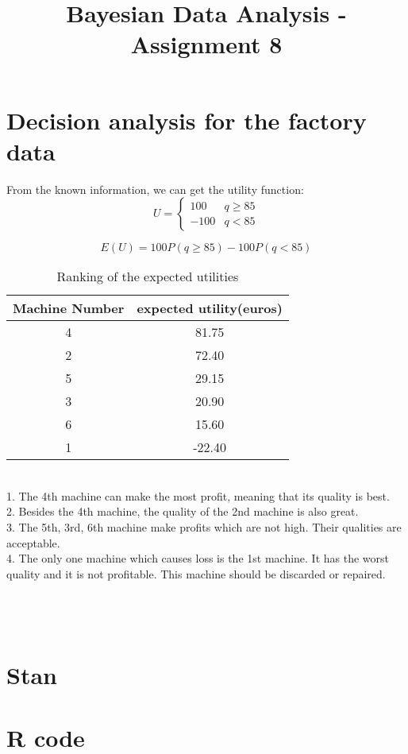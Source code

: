 \documentclass[article,11pt]{article}
\title{\huge Bayesian Data Analysis - Assignment 8}
\begin{document}
 \maketitle
 \section*{Decision analysis for the factory data}
 From the known information, we can get the utility function:
 \begin{equation*}
 U=
 \begin{cases}
 100& q \ge 85\\
 -100& q<85 
 \end{cases} 
 \end{equation*}
 
 \begin{equation*}
  E(U) = 100P(q\ge 85)-100P(q<85)
 \end{equation*}
 \begin{table}[H]
 	\centering
 	\begin{tabular}{|c|c|}
 		\hline
 		\textbf{Machine Number} & \textbf{expected utility(euros)}    \\ \hline\hline
 		4  & 81.75   \\ \hline
 		2 & 72.40   \\ \hline
 		5 &29.15  \\ \hline
 		3 &20.90  \\ \hline
 		6 &15.60  \\ \hline
 		1 &-22.40  \\ \hline
 	\end{tabular}
 	\caption{Ranking of the expected utilities}
 	\label{tab:t1}
 \end{table}
\\
	1. The 4th machine can make the most profit, meaning that its quality is best. \\
	2. Besides the 4th machine, the quality of the 2nd machine is also great. \\
	3. The 5th, 3rd, 6th machine make profits which are not high. Their qualities are acceptable. \\
	4. The only one machine which causes loss is the 1st machine. It has the worst quality and it is not profitable. This machine should be discarded or repaired.\\ \\
	
	 \\ \\
	
	\appendix
	\section{Stan}
	
	\section{R code}
	
\end{document}
